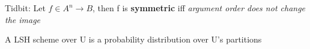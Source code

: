 	Tidbit: Let $f \in A^n \to B$, then f is \textbf{symmetric} iff \textit{argument order does not change the image} %
	
	A LSH scheme over U is a probability distribution over U's partitions
	
	
	
	
	
	
	
	
	
	
	
	
	
	
	
